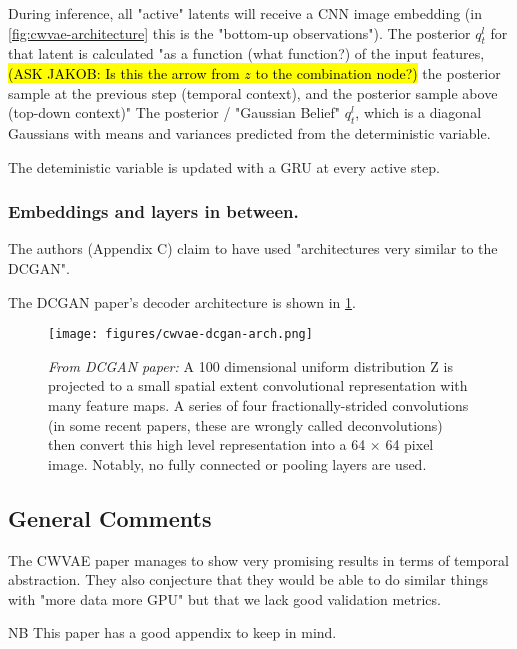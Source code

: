 During inference, all "active" latents will receive a CNN image embedding (in \cref{fig:cwvae-architecture} this is the "bottom-up observations").
The posterior \(q^l_t\) for that latent is calculated 
"as a function (what function?) of the input features, 
\hl{(ASK JAKOB: Is this the arrow from $z$ to the combination node?) } 
the posterior sample at the previous step (temporal context), 
and the posterior sample above (top-down context)"
The posterior / "Gaussian Belief" \(q^l_t\), which is a diagonal Gaussians with means and variances predicted from the deterministic variable.


The deteministic variable is updated with a GRU at every active step.

\subsubsection{Embeddings and layers in between.}

The authors (Appendix C) claim to have used "architectures very similar to the DCGAN".

The DCGAN paper's decoder architecture is shown in \cref{fig:cwvae-dcgan-arch}. \cite{radford_unsupervised_2016}

\begin{figure}[hb]
    \begin{small}
        \begin{center}
            \texttt{[image: figures/cwvae-dcgan-arch.png]}
        \end{center}
        \caption{\textit{From DCGAN paper: }
        A 100 dimensional uniform distribution Z is projected to a small spatial extent convolutional representation with many feature maps.
        A series of four fractionally-strided convolutions (in some recent papers, these are wrongly called
        deconvolutions) then convert this high level representation into a 64 × 64 pixel image. Notably, no
        fully connected or pooling layers are used.}
        \label{fig:cwvae-dcgan-arch}
    \end{small}
\end{figure}



\subsection{General Comments} %
The CWVAE paper manages to show very promising results in terms of temporal abstraction. 
They also conjecture that they would be able to do similar things with "more data more GPU" but that we lack good validation metrics. 


NB This paper has a good appendix to keep in mind. 

